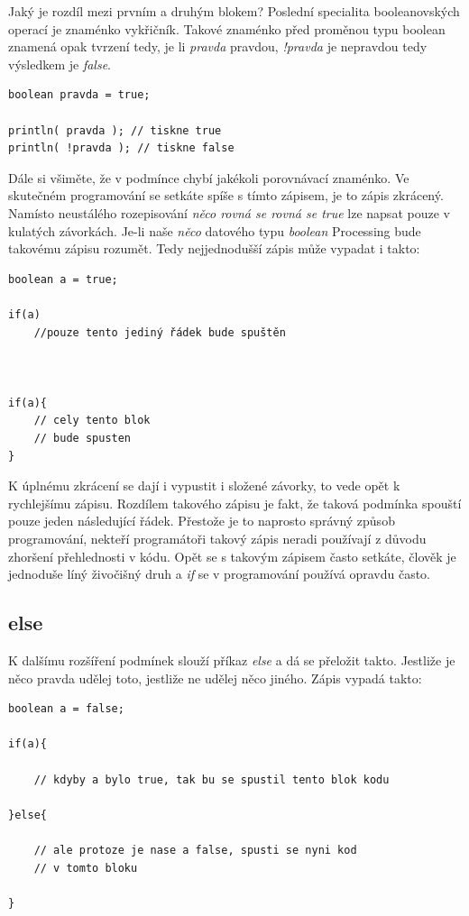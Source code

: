 \documentclass[11pt]{book}
\newcommand{\pododdil}[1]{\subsection{#1}\label{subsec:#1}}
\begin{document}
Jaký je rozdíl mezi prvním a druhým blokem? Poslední specialita booleanovských operací je znaménko vykřičník. Takové znaménko před proměnou typu boolean znamená opak tvrzení tedy, je li {\em pravda} pravdou, {\em !pravda} je nepravdou tedy výsledkem je {\em false}.


\begin{lstlisting}
boolean pravda = true;

println( pravda ); // tiskne true
println( !pravda ); // tiskne false
\end{lstlisting}



Dále si všiměte, že v podmínce chybí jakékoli porovnávací znaménko. Ve skutečném programování se setkáte spíše s tímto zápisem, je to zápis zkrácený. Namísto neustálého rozepisování {\em něco rovná se rovná se true} lze napsat pouze v kulatých závorkách. Je-li naše {\em něco} datového typu {\em boolean} Processing bude takovému zápisu rozumět. Tedy nejjednodušší zápis může vypadat i takto:

  
\begin{lstlisting}
boolean a = true;

if(a)
	//pouze tento jediný řádek bude spuštěn
	
	
	
if(a){
	// cely tento blok
	// bude spusten
}
\end{lstlisting}

K úplnému zkrácení se dají i vypustit i složené závorky, to vede opět k rychlejšímu zápisu. Rozdílem takového zápisu je fakt, že taková podmínka spouští pouze jeden následující řádek. Přestože je to naprosto správný způsob programování, nekteří programátoři takový zápis neradi používají z důvodu zhoršení přehlednosti v kódu. Opět se s takovým zápisem často setkáte, člověk je jednoduše líný živočišný druh a {\em if} se v programování používá opravdu často.

\pododdil{else}

K dalšímu rozšíření podmínek slouží příkaz {\em else} a dá se přeložit takto. Jestliže je něco pravda udělej toto, jestliže ne udělej něco jiného. Zápis vypadá takto:

\begin{lstlisting}
boolean a = false;

if(a){

	// kdyby a bylo true, tak bu se spustil tento blok kodu 

}else{

	// ale protoze je nase a false, spusti se nyni kod
	// v tomto bloku
	
}
\end{lstlisting}
\end{document}
